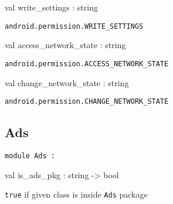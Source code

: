\documentclass[11pt]{article}
\begin{document}
\begin{ocamldocsigend}
\begin{ocamldocdescription}
\end{ocamldocdescription}


\label{val:Android.Permission.write-underscoresettings}\begin{ocamldoccode}
val write_settings : string
\end{ocamldoccode}
\begin{ocamldocdescription}
{\tt{android.permission.WRITE\_SETTINGS}}


\end{ocamldocdescription}


\label{val:Android.Permission.access-underscorenetwork-underscorestate}\begin{ocamldoccode}
val access_network_state : string
\end{ocamldoccode}
\begin{ocamldocdescription}
{\tt{android.permission.ACCESS\_NETWORK\_STATE}}


\end{ocamldocdescription}


\label{val:Android.Permission.change-underscorenetwork-underscorestate}\begin{ocamldoccode}
val change_network_state : string
\end{ocamldoccode}
\begin{ocamldocdescription}
{\tt{android.permission.CHANGE\_NETWORK\_STATE}}


\end{ocamldocdescription}
\end{ocamldocsigend}






\subsection{Ads}




\begin{ocamldoccode}
{\tt{module }}{\tt{Ads}}{\tt{ : }}\end{ocamldoccode}
\label{module:Android.Ads}

\begin{ocamldocsigend}


\label{val:Android.Ads.is-underscoreads-underscorepkg}\begin{ocamldoccode}
val is_ads_pkg : string -> bool
\end{ocamldoccode}
\begin{ocamldocdescription}
{\tt{true}} if given class is inside {\tt{Ads}} package


\end{ocamldocdescription}
\end{ocamldocsigend}
\end{document}
